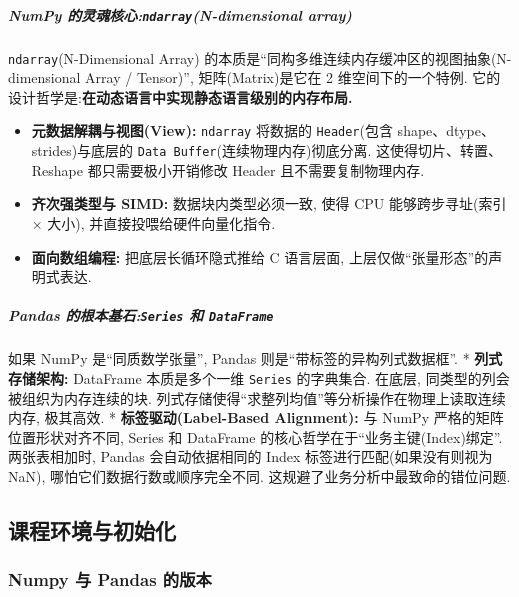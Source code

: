 \documentclass[11pt]{article}
\providecommand{\tightlist}{%
      \setlength{\itemsep}{0pt}\setlength{\parskip}{0pt}}
\begin{document}
    \subparagraph{\texorpdfstring{NumPy
的灵魂核心:\texttt{ndarray}(N-dimensional
array)}{NumPy 的灵魂核心:ndarray(N-dimensional array)}}\label{numpy-ux7684ux7075ux9b42ux6838ux5fc3ndarrayn-dimensional-array}

    \texttt{ndarray}(N-Dimensional Array)
的本质是``同构多维连续内存缓冲区的视图抽象(N-dimensional Array /
Tensor)'', 矩阵(Matrix)是它在 2 维空间下的一个特例.
它的设计哲学是:\textbf{在动态语言中实现静态语言级别的内存布局.}

\begin{itemize}
\tightlist
\item
  \textbf{元数据解耦与视图(View):} \texttt{ndarray} 将数据的
  \texttt{Header}(包含 shape、dtype、strides)与底层的
  \texttt{Data\ Buffer}(连续物理内存)彻底分离. 这使得切片、转置、Reshape
  都只需要极小开销修改 Header 且不需要复制物理内存.
\item
  \textbf{齐次强类型与 SIMD:} 数据块内类型必须一致, 使得 CPU
  能够跨步寻址(索引 × 大小), 并直接投喂给硬件向量化指令.
\item
  \textbf{面向数组编程:} 把底层长循环隐式推给 C 语言层面,
  上层仅做``张量形态''的声明式表达.
\end{itemize}

    \subparagraph{\texorpdfstring{Pandas 的根本基石:\texttt{Series} 和
\texttt{DataFrame}}{Pandas 的根本基石:Series 和 DataFrame}}\label{pandas-ux7684ux6839ux672cux57faux77f3series-ux548c-dataframe}

    如果 NumPy 是``同质数学张量'', Pandas 则是``带标签的异构列式数据框''. *
\textbf{列式存储架构:} DataFrame 本质是多个一维 \texttt{Series}
的字典集合. 在底层, 同类型的列会被组织为内存连续的块.
列式存储使得``求整列均值''等分析操作在物理上读取连续内存, 极其高效. *
\textbf{标签驱动(Label-Based Alignment):} 与 NumPy
严格的矩阵位置形状对齐不同, Series 和 DataFrame
的核心哲学在于``业务主键(Index)绑定''. 两张表相加时, Pandas
会自动依据相同的 Index 标签进行匹配(如果没有则视为 NaN),
哪怕它们数据行数或顺序完全不同. 这规避了业务分析中最致命的错位问题.

    \subsection{课程环境与初始化}\label{ux8bfeux7a0bux73afux5883ux4e0eux521dux59cbux5316}

    \subsubsection{Numpy 与 Pandas
的版本}\label{numpy-ux4e0e-pandas-ux7684ux7248ux672c}
\end{document}
